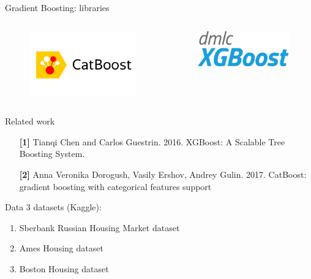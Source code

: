 \begin{frame}{Gradient Boosting: libraries}
\begin{columns}
		
		\begin{column}{0.33\textwidth}
			\centering
			\begin{figure}
				\includegraphics[width=\columnwidth]{figures/catboost}
			\end{figure}
		\end{column}
		
		\begin{column}{0.33\textwidth}
			\centering
			\begin{figure}
				\includegraphics[width=\columnwidth]{figures/xgboost}
			\end{figure}
		\end{column}
		
	\end{columns}
\end{frame}

\begin{frame}{Related work}
	\begin{enumerate}
		\item[\textbf{[1]}] Tianqi Chen and Carlos Guestrin. 2016. XGBoost: A Scalable Tree Boosting System. 
		\item[\textbf{[2]}] Anna Veronika Dorogush, Vasily Ershov, Andrey Gulin. 2017. CatBoost: gradient boosting with categorical features support
	\end{enumerate}
\end{frame}

\begin{frame}{Data}
	3 datasets (Kaggle):
	\begin{enumerate}
		\item Sberbank Russian Housing Market dataset 
		\item Ames Housing dataset 
		\item Boston Housing dataset 
	\end{enumerate}
\end{frame}
